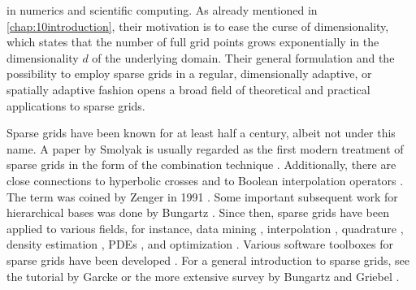 
\label{chap:20sparseGrids}

in numerics and scientific computing.
As already mentioned in \cref{chap:10introduction},
their motivation is to ease the curse of dimensionality,
which states that the number of full grid points
grows exponentially in the dimensionality $d$ of the underlying domain.
Their general formulation and the possibility to employ sparse grids in a
regular, dimensionally adaptive, or spatially adaptive fashion
opens a broad field of theoretical and practical applications
to sparse grids.

Sparse grids have been known for at least half a century,
albeit not under this name.
A paper by Smolyak \cite{Smolyak63Quadrature} is usually regarded
as the first modern treatment of sparse grids in the form
of the combination technique \cite{Garcke13Sparse}.
Additionally, there are close connections to
hyperbolic crosses \cite{Temljakov82Approximation}
and to Boolean interpolation operators
.
The term  was coined by Zenger in 1991
\cite{Zenger91Sparse}.
Some important subsequent work for hierarchical bases was done by Bungartz
.
Since then, sparse grids have been applied to various fields,
for instance,
data mining
,
interpolation
\cite{Sickel11Spline},
quadrature
\cite{Gerstner98Numerical},
density estimation
,
PDEs
, and
optimization
.
Various software toolboxes for sparse grids have been developed
.
For a general introduction to sparse grids,
see the tutorial by Garcke \cite{Garcke13Sparse} or
the more extensive survey by Bungartz and Griebel
\cite{Bungartz04Sparse}.

